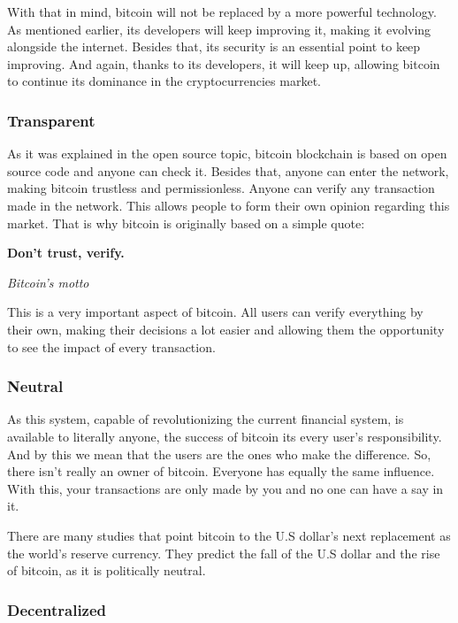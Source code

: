 \documentclass{article}
\newcommand\tab[1][1cm]{\hspace*{#1}}
\begin{document}
With that in mind, bitcoin will not be replaced by a more powerful technology. As mentioned earlier, its developers will keep improving it, making it evolving alongside the internet. Besides that, its security is an essential point to keep improving. And again, thanks to its developers, it will keep up, allowing bitcoin to continue its dominance in the cryptocurrencies market.

\subsubsection{Transparent}

\tab As it was explained in the open source topic, bitcoin blockchain is based on open source code and anyone can check it. Besides that, anyone can enter the network, making bitcoin trustless and permissionless. Anyone can verify any transaction made in the network. This allows people to form their own opinion regarding this market. That is why bitcoin is originally based on a simple quote:

\renewcommand{\epigraphflush}{center}
\epigraph{\textbf{Don't trust, verify.}}{\textit{Bitcoin's motto}}

This is a very important aspect of bitcoin. All users can verify everything by their own, making their decisions a lot easier and allowing them the opportunity to see the impact of every transaction.

\subsubsection{Neutral}

\tab As this system, capable of revolutionizing the current financial system, is available to literally anyone, the success of bitcoin its every user's responsibility. And by this we mean that the users are the ones who make the difference. So, there isn't really an owner of bitcoin. Everyone has equally the same influence. With this, your transactions are only made by you and no one can have a say in it. 

There are many studies that point bitcoin to the U.S dollar's next replacement as the world's reserve currency. They predict the fall of the U.S dollar and the rise of bitcoin, as it is politically neutral. 

\subsubsection{Decentralized}
\end{document}
